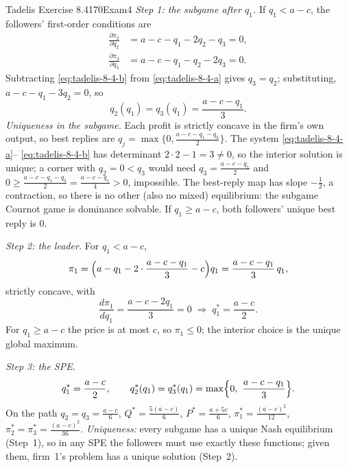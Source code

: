 \begin{exsol}{Tadelis Exercise 8.4}{170}{Exam}{4}
\emph{Step 1: the subgame after $q_1$.} If $q_1 < a - c$, the followers' first-order conditions are
\begin{align}
  \frac{\partial\pi_2}{\partial q_2} &= a - c - q_1 - 2q_2 - q_3 = 0, \label{eq:tadelis-8-4-a}\\
  \frac{\partial\pi_3}{\partial q_3} &= a - c - q_1 - q_2 - 2q_3 = 0. \label{eq:tadelis-8-4-b}
\end{align}
Subtracting \eqref{eq:tadelis-8-4-b} from \eqref{eq:tadelis-8-4-a} gives $q_3 = q_2$; substituting,
$a - c - q_1 - 3q_2 = 0$, so
\[
  q_2(q_1) = q_3(q_1) = \frac{a - c - q_1}{3}.
\]
\emph{Uniqueness in the subgame.} Each profit is strictly concave in the firm's own output, so best
replies are $q_j = \max\{0, \frac{a - c - q_1 - q_k}{2}\}$. The system \eqref{eq:tadelis-8-4-a}--%
\eqref{eq:tadelis-8-4-b} has determinant $2\cdot 2 - 1 = 3 \neq 0$, so the interior solution is
unique; a corner with $q_2 = 0 < q_3$ would need $q_3 = \frac{a-c-q_1}{2}$ and $0 \ge
\frac{a-c-q_1-q_3}{2} = \frac{a - c - q_1}{4} > 0$, impossible. The best-reply map has slope
$-\frac12$, a contraction, so there is no other (also no mixed) equilibrium: the subgame Cournot game
is dominance solvable. If $q_1 \ge a - c$, both followers' unique best reply is $0$.

\emph{Step 2: the leader.} For $q_1 < a - c$,
\[
  \pi_1 = \Bigl(a - q_1 - 2\cdot\frac{a - c - q_1}{3} - c\Bigr) q_1 = \frac{a - c - q_1}{3}\, q_1 ,
\]
strictly concave, with
\[
  \frac{d\pi_1}{dq_1} = \frac{a - c - 2q_1}{3} = 0 \;\Rightarrow\; q_1^* = \frac{a - c}{2}.
\]
For $q_1 \ge a - c$ the price is at most $c$, so $\pi_1 \le 0$; the interior choice is the unique
global maximum.

\emph{Step 3: the SPE.}
\[
  q_1^* = \frac{a - c}{2}, \qquad q_2^*(q_1) = q_3^*(q_1) = \max\Bigl\{0,\ \frac{a - c - q_1}{3}\Bigr\}.
\]
On the path $q_2 = q_3 = \frac{a-c}{6}$, $Q^* = \frac{5(a-c)}{6}$, $P^* = \frac{a + 5c}{6}$,
$\pi_1^* = \frac{(a-c)^2}{12}$, $\pi_2^* = \pi_3^* = \frac{(a-c)^2}{36}$. \emph{Uniqueness:} every subgame
has a unique Nash equilibrium (Step~1), so in any SPE the followers must use exactly these functions;
given them, firm~1's problem has a unique solution (Step~2).


\end{exsol}
